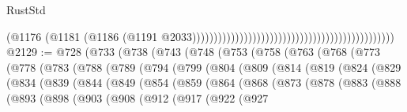 \begin{lexlean}{RustStd}
\begin{coremodule}
                                                                                          (@1176
                                                                                            (@1181
                                                                                              (@1186
                                                                                                (@1191
                                                                                                  @2033)))))))))))))))))))))))))))))))))))))))))))))))
@2129 := @728
    (@733
      (@738
        (@743
          (@748
            (@753
              (@758
                (@763
                  (@768
                    (@773
                      (@778
                        (@783
                          (@788
                            (@789
                              (@794
                                (@799
                                  (@804
                                    (@809
                                      (@814
                                        (@819
                                          (@824
                                            (@829
                                              (@834
                                                (@839
                                                  (@844
                                                    (@849
                                                      (@854
                                                        (@859
                                                          (@864
                                                            (@868
                                                              (@873
                                                                (@878
                                                                  (@883
                                                                    (@888
                                                                      (@893
                                                                        (@898
                                                                          (@903
                                                                            (@908
                                                                              (@912
                                                                                (@917
                                                                                  (@922
                                                                                    (@927

\end{coremodule}
\end{lexlean}
